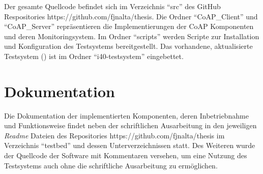 Der gesamte Quellcode befindet sich im Verzeichnis "`src"' des GitHub Respositories https://github.com/fjnalta/thesis. Die Ordner "`CoAP\_Client"' und "`CoAP\_Server"' repräsentieren die Implementierungen der \ac{CoAP} Komponenten und deren Monitoringsystem. Im Ordner "`scripts"' werden Scripte zur Installation und Konfiguration des Testsystems bereitgestellt. Das vorhandene, aktualisierte Testsystem (\cite{Weber2018}) ist im Ordner "`i40-testsystem"' eingebettet.

\section{Dokumentation}
Die Dokumentation der implementierten Komponenten, deren Inbetriebnahme und Funktionsweise findet neben der schriftlichen Ausarbeitung in den jeweiligen \textit{Readme} Dateien des Repositories https://github.com/fjnalta/thesis im Verzeichnis "`testbed"' und dessen Unterverzeichnissen statt. Des Weiteren wurde der Quellcode der Software mit Kommentaren versehen, um eine Nutzung des Testsystems auch ohne die schriftliche Ausarbeitung zu ermöglichen.